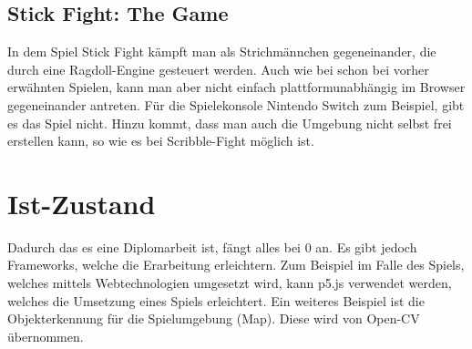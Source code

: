 \subsection{Stick Fight: The Game}
In dem Spiel Stick Fight kämpft man als Strichmännchen gegeneinander, die durch eine Ragdoll-Engine gesteuert werden.
Auch wie bei schon bei vorher erwähnten Spielen, kann man aber nicht einfach plattformunabhängig im Browser gegeneinander antreten.
Für die Spielekonsole Nintendo Switch zum Beispiel, gibt es das Spiel nicht. Hinzu kommt, dass man auch die Umgebung nicht selbst frei erstellen kann, so wie es bei Scribble-Fight möglich ist.

\section{Ist-Zustand}
Dadurch das es eine Diplomarbeit ist, fängt alles bei 0 an. Es gibt jedoch Frameworks,
welche die Erarbeitung erleichtern. Zum Beispiel im Falle des Spiels, welches
mittels Webtechnologien umgesetzt wird, kann p5.js verwendet werden, welches die
Umsetzung eines Spiels erleichtert. Ein weiteres Beispiel ist die Objekterkennung für
die Spielumgebung (Map). Diese wird von Open-CV übernommen.
